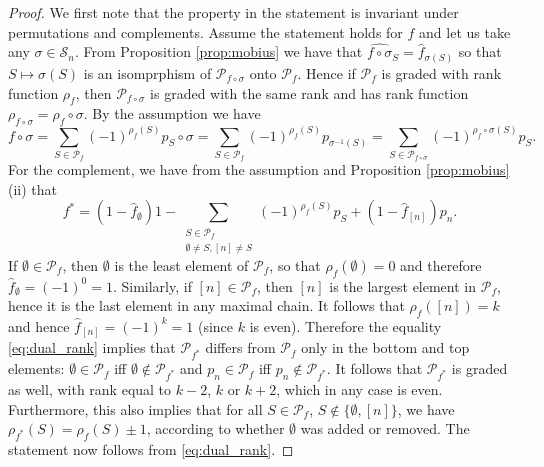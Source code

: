 \documentclass[12pt]{article}
\theoremstyle{definition}
\theoremstyle{remark}
\def\Pe{\mathcal P}
\def\permut{\mathscr{S}}
\begin{document}
\begin{proof} 
We first note that the property in the statement is invariant under permutations and
complements. Assume  the statement holds for $f$ and let us take any $\sigma\in \permut_n$.
From Proposition \ref{prop:mobius} we have that  
$\widehat{f\circ \sigma}_S=\hat f_{\sigma(S)}$ so that $S\mapsto \sigma(S)$ is an
isomprphism  of  
$\mathcal P_{f\circ \sigma}$ onto $\mathcal P_{f}$. Hence if $\Pe_f$ is graded with rank
function $\rho_f$, then $\Pe_{f\circ\sigma}$ is graded with the same rank and has rank function
$\rho_{f\circ\sigma}=\rho_f\circ \sigma$. By the assumption we have 
\[
f\circ\sigma=\sum_{S\in \Pe_f}(-1)^{\rho_f(S)}p_S\circ\sigma=\sum_{S\in
\Pe_f}(-1)^{\rho_f(S)}p_{\sigma^{-1}(S)}=\sum_{S\in
\Pe_{f\circ\sigma}}(-1)^{\rho_f\circ \sigma(S)}p_{S}.
\]
For the complement, we have from the assumption and Proposition \ref{prop:mobius}(ii) that
\begin{equation}\label{eq:dual_rank}
f^*=(1-\hat f_\emptyset)1 -\sum_{\substack{S\in \mathcal P_f\\ \emptyset \ne S,
[n]\ne S}}
(-1)^{\rho_f(S)}p_S+(1- \hat f_{[n]})p_n.
\end{equation}
If $\emptyset \in \Pe_f$, then $\emptyset$ is the least element of $\Pe_f$, so that 
$\rho_f(\emptyset)=0$ and therefore $\hat f_\emptyset =
(-1)^0=1$. Similarly, if $[n]\in \Pe_f$, then $[n]$ is the largest element in $\Pe_f$,
hence it is the last element in any maximal chain. It follows that $\rho_f([n])=k$ and hence
$\hat f_{[n]}=(-1)^k=1$ (since $k$ is even). 
Therefore the equality \eqref{eq:dual_rank} implies that $\mathcal P_{f^*}$ differs from $\mathcal P_f$ only in the bottom  and
top elements:  $\emptyset \in \mathcal P_f$ iff  $\emptyset \notin \mathcal P_{f^*}$
and $p_n \in \mathcal P_f$ iff  $p_n \notin \mathcal P_{f^*}$. It follows that $\mathcal
P_{f^*}$ is graded as well, with rank  equal to $k-2$, $k$ or $k+2$, which in any case
is even. Furthermore,  this also implies 
that for all $S\in \Pe_f$, $S\notin \{\emptyset, [n]\}$, we
have  $\rho_{f^*}(S)=\rho_f(S)\pm 1$, according to whether $\emptyset$ was added or removed. The
statement now follows from \eqref{eq:dual_rank}. 


\end{proof}
\end{document}
